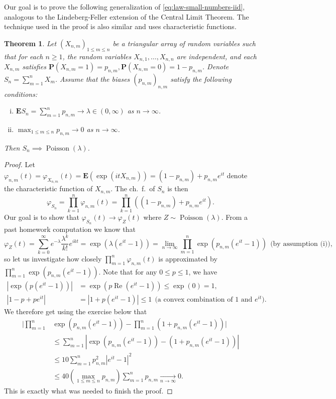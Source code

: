 \documentclass[12pt]{article}
\newtheorem{thm}{Theorem}[section]
\newcommand{\prob}{\mathbf{P}}
\newcommand{\expec}{\mathbf{E}}
\theoremstyle{example}
\begin{document}
Our goal is to prove the following generalization of \eqref{eq:law-small-numbers-iid}, analogous to the Lindeberg-Feller extension of the Central Limit Theorem. The technique used in the proof is also similar and uses characteristic functions.

\begin{thm}
Let $(X_{n,m})_{1\le m\le n}$ be a triangular array of random variables such that for each $n\ge1$, the random variables $X_{n,1},\ldots,X_{n,n}$ are independent, and each $X_{n,m}$ satisfies $\prob(X_{n,m}=1)=p_{n,m}, \prob(X_{n,m}=0)=1-p_{n,m}$. Denote $S_n=\sum_{m=1}^n X_m$. Assume that the biases $(p_{n,m})_{n,m}$ satisfy the following conditions:
\begin{enumerate}[(i)]
\item $\expec S_n = \sum_{m=1}^n p_{n,m} \to \lambda\in(0,\infty)$ as $n\to\infty$.
\item $\max_{1\le m\le n} p_{n,m} \to 0$ as $n\to\infty$.
\end{enumerate}
Then $S_n \implies \operatorname{Poisson}(\lambda)$.
\end{thm}

\begin{proof}
Let $\varphi_{n,m}(t)=\varphi_{X_{n,m}}(t)=\expec(\exp(it X_{n,m})) = (1-p_{n,m})+p_{n,m}e^{it}$ denote the characteristic function of $X_{n,m}$. The ch.~f.\ of $S_n$ is then
$$ \varphi_{S_n} = \prod_{k=1}^n \varphi_{n,m}(t) = \prod_{k=1}^n \left((1-p_{n,m})+p_{n,m}e^{it}\right). $$
Our goal is to show that $\varphi_{S_n}(t)\to \varphi_Z(t)$ where $Z\sim \operatorname{Poisson}(\lambda)$. From a past homework computation we know that
$$ \varphi_Z(t) = \sum_{k=0}^\infty e^{-\lambda} \frac{\lambda^k}{k!} e^{ikt} =\exp(\lambda(e^{it}-1)) = \lim_{n\to\infty} \prod_{m=1}^n \exp(p_{n,m}(e^{it}-1))
\ \ \textrm{(by assumption (i)),}$$
so let us investigate how closely $\prod_{m=1}^n\varphi_{n,m}(t)$ is approximated by $\prod_{m=1}^n\exp(p_{n,m}(e^{it}-1))$. Note that for any $0\le p\le 1$, we have
\begin{align*}
|\exp(p(e^{it}-1))| &= \exp(p \operatorname{Re}(e^{it}-1)) \le \exp(0)=1, \\
|1-p+pe^{it}| &= |1+p(e^{it}-1)| \le 1 \ \ \textrm{(a convex combination of $1$ and $e^{it}$)}.
\end{align*}
We therefore get using the exercise below that
\begin{align*}
\Bigg| \prod_{m=1}^n &\exp\left(p_{n,m}(e^{it}-1)\right)-\prod_{m=1}^n (1+p_{n,m}(e^{it}-1))\Bigg| \\ &
\le \sum_{m=1}^n |\exp\left(p_{n,m}(e^{it}-1)\right)-(1+p_{n,m}(e^{it}-1))|
\\ &\le 10\sum_{m=1}^n p_{n,m}^2 |e^{it}-1|^2
\\ &\le 40\left(\max_{1\le m\le n} p_{n,m}\right) \sum_{m=1}^n p_{n,m} \xrightarrow[n\to\infty]{} 0.
\end{align*}
This is exactly what was needed to finish the proof.
\end{proof}
\end{document}

